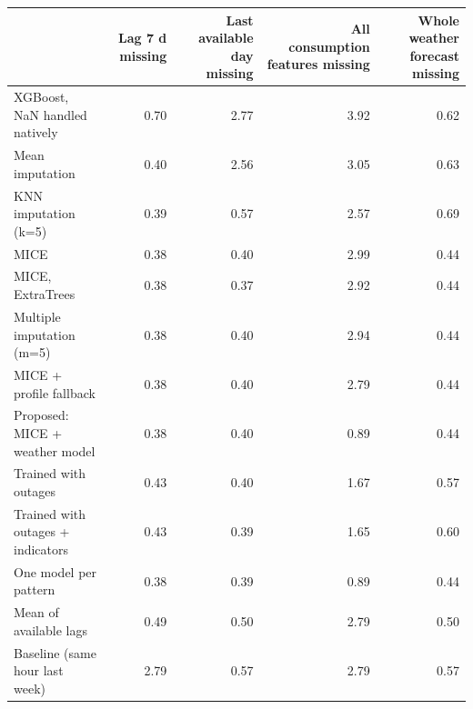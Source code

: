 \begin{tabular}{lrrrr}
\toprule
 & Lag 7 d missing & Last available day missing & All consumption features missing & Whole weather forecast missing \\
\midrule
XGBoost, NaN handled natively & 0.70 & 2.77 & 3.92 & 0.62 \\
Mean imputation & 0.40 & 2.56 & 3.05 & 0.63 \\
KNN imputation (k=5) & 0.39 & 0.57 & 2.57 & 0.69 \\
MICE & 0.38 & 0.40 & 2.99 & 0.44 \\
MICE, ExtraTrees & 0.38 & 0.37 & 2.92 & 0.44 \\
Multiple imputation (m=5) & 0.38 & 0.40 & 2.94 & 0.44 \\
MICE + profile fallback & 0.38 & 0.40 & 2.79 & 0.44 \\
Proposed: MICE + weather model & 0.38 & 0.40 & 0.89 & 0.44 \\
Trained with outages & 0.43 & 0.40 & 1.67 & 0.57 \\
Trained with outages + indicators & 0.43 & 0.39 & 1.65 & 0.60 \\
One model per pattern & 0.38 & 0.39 & 0.89 & 0.44 \\
Mean of available lags & 0.49 & 0.50 & 2.79 & 0.50 \\
Baseline (same hour last week) & 2.79 & 0.57 & 2.79 & 0.57 \\
\bottomrule
\end{tabular}
